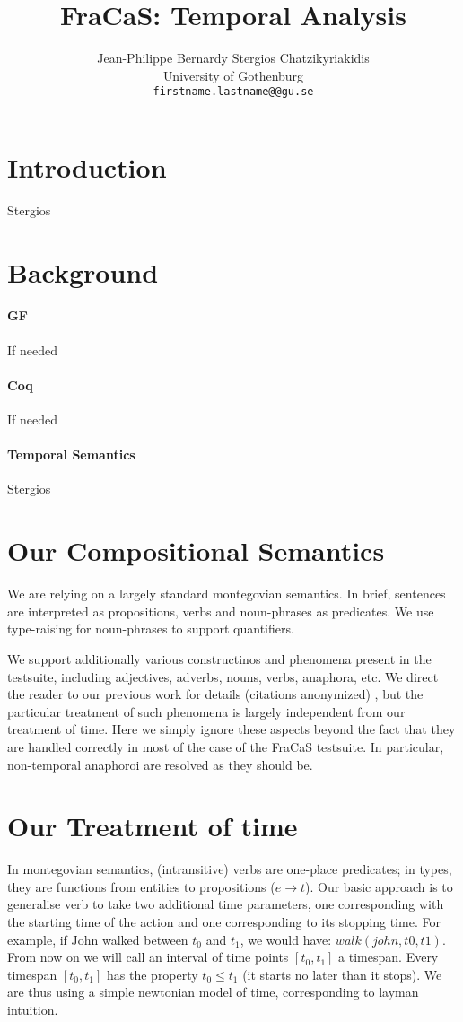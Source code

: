\documentclass[a4paper,11pt]{article}
\title{FraCaS: Temporal Analysis}
\author{Jean-Philippe Bernardy \qquad Stergios Chatzikyriakidis \\
  University of Gothenburg\\
  {\tt firstname.lastname@@gu.se} \\}
\date{}
\begin{document}
\maketitle

\section{Introduction}
Stergios
\section{Background}
\paragraph{GF}
If needed
\paragraph{Coq}
If needed
\paragraph{Temporal Semantics}
Stergios
 
\section{Our Compositional Semantics}

We are relying on a largely standard montegovian semantics. In brief,
sentences are interpreted as propositions, verbs and noun-phrases as
predicates.  We use type-raising for noun-phrases to support
quantifiers.

We support additionally various constructinos and phenomena present in
the testsuite, including adjectives, adverbs, nouns, verbs, anaphora,
etc. We direct the reader to our previous work for details \ifanon
(citations anonymized) \else \citet{} \fi, but the particular
treatment of such phenomena is largely independent from our treatment
of time.
%
Here we simply ignore these aspects beyond the fact that they
are handled correctly in most of the case of the FraCaS testsuite.  In
particular, non-temporal anaphoroi are resolved as they should be.

\section{Our Treatment of time}

In montegovian semantics, (intransitive) verbs are one-place
predicates; in types, they are functions from entities to propositions
($e \to t$).  Our basic approach is to generalise verb to take two
additional time parameters, one corresponding with the starting time
of the action and one corresponding to its stopping time. For example,
if John walked between $t_0$ and $t_1$, we would have:
$walk(john,t0,t1)$. From now on we will call an interval of time
points $[t_0,t_1]$ a timespan. Every timespan $[t_0,t_1]$ has the
property $t_0 ≤ t_1$ (it starts no later than it stops). We are thus
using a simple newtonian model of time, corresponding to layman
intuition.
\end{document}
